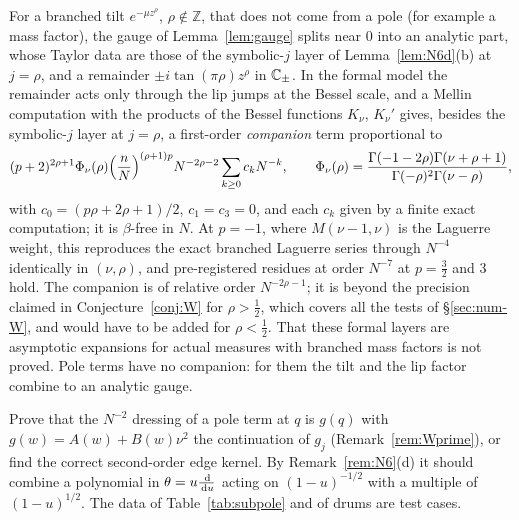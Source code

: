 \begin{remark}\label{rem:companion}
For a branched tilt $e^{-\mu z^\rho}$, $\rho\notin\mathbb Z$, that does not come from a pole (for example a mass factor), the gauge of
Lemma~\ref{lem:gauge} splits near $0$ into an analytic part, whose Taylor data are those of the symbolic-$j$ layer of
Lemma~\ref{lem:N6d}(b) at $j=\rho$, and a remainder $\pm i\tan(\pi\rho)z^\rho$ in $\mathbb{C}_\pm$. In the formal model the remainder acts only through
the lip jumps at the Bessel scale, and a Mellin computation with the products of the Bessel functions $K_\nu$, $K_\nu'$ gives, besides the
symbolic-$j$ layer at $j=\rho$, a first-order \emph{companion} term proportional to
\[
  (p+2)^{2\rho+1}\Phi_\nu(\rho)\Bigl(\frac nN\Bigr)^{(\rho+1)p}N^{-2\rho-2}\sum_{k\ge0}c_kN^{-k},\qquad
  \Phi_\nu(\rho)=\frac{\Gamma(-1-2\rho)\Gamma(\nu+\rho+1)}{\Gamma(-\rho)^2\Gamma(\nu-\rho)},
\]
with $c_0=(p\rho+2\rho+1)/2$, $c_1=c_3=0$, and each $c_k$ given by a finite exact computation; it is $\beta$-free in $N$. At
$p=-1$, where $M(\nu-1,\nu)$ is the Laguerre weight, this reproduces the exact branched Laguerre series through $N^{-4}$ identically in
$(\nu,\rho)$, and pre-registered residues at order $N^{-7}$ at $p=\frac32$ and $3$ hold. The companion is of relative order $N^{-2\rho-1}$; it is
beyond the precision claimed in Conjecture~\ref{conj:W} for $\rho>\frac12$, which covers all the tests of \S\ref{sec:num-W}, and would
have to be added for $\rho<\frac12$. That these formal layers are asymptotic expansions for actual measures with branched mass factors is
not proved. Pole terms have no companion: for them the tilt and the lip factor combine to an analytic gauge.
\end{remark}

\begin{problem}\label{prob:kernel2}
Prove that the $N^{-2}$ dressing of a pole term at $q$ is $g(q)$ with $g(w)=A(w)+B(w)\nu^2$ the continuation of $g_j$ (Remark~\ref{rem:Wprime}),
or find the correct second-order edge kernel. By Remark~\ref{rem:N6}(d) it should combine a polynomial in $\theta=u\frac{\,\mathrm{d}}{\,\mathrm{d} u}$
acting on $(1-u)^{-1/2}$ with a multiple of $(1-u)^{1/2}$. The data of Table~\ref{tab:subpole} and of drums are test cases.
\end{problem}

